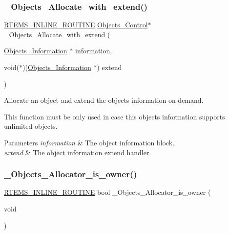 \subsubsection{\texorpdfstring{\_Objects\_Allocate\_with\_extend()}{\_Objects\_Allocate\_with\_extend()}}
{\footnotesize\ttfamily \mbox{\hyperlink{group__RTEMSScoreBaseDefs_gac216239df231d5dbd15e3520b0b9313f}{R\+T\+E\+M\+S\+\_\+\+I\+N\+L\+I\+N\+E\+\_\+\+R\+O\+U\+T\+I\+NE}} \mbox{\hyperlink{structObjects__Control}{Objects\+\_\+\+Control}}$\ast$ \+\_\+\+Objects\+\_\+\+Allocate\+\_\+with\+\_\+extend (\begin{DoxyParamCaption}\item[{\mbox{\hyperlink{structObjects__Information}{Objects\+\_\+\+Information}} $\ast$}]{information,  }\item[{void($\ast$)(\mbox{\hyperlink{structObjects__Information}{Objects\+\_\+\+Information}} $\ast$)}]{extend }\end{DoxyParamCaption})}



Allocate an object and extend the objects information on demand. 

This function must be only used in case this objects information supports unlimited objects.


\begin{DoxyParams}{Parameters}
{\em information} & The object information block. \\
\hline
{\em extend} & The object information extend handler. \\
\hline
\end{DoxyParams}
\mbox{\label{group__RTEMSScoreObject_ga67f9cdae9423a81e46626f0e2cb9f305}} 
\subsubsection{\texorpdfstring{\_Objects\_Allocator\_is\_owner()}{\_Objects\_Allocator\_is\_owner()}}
{\footnotesize\ttfamily \mbox{\hyperlink{group__RTEMSScoreBaseDefs_gac216239df231d5dbd15e3520b0b9313f}{R\+T\+E\+M\+S\+\_\+\+I\+N\+L\+I\+N\+E\+\_\+\+R\+O\+U\+T\+I\+NE}} bool \+\_\+\+Objects\+\_\+\+Allocator\+\_\+is\+\_\+owner (\begin{DoxyParamCaption}\item[{void}]{ }\end{DoxyParamCaption})}



